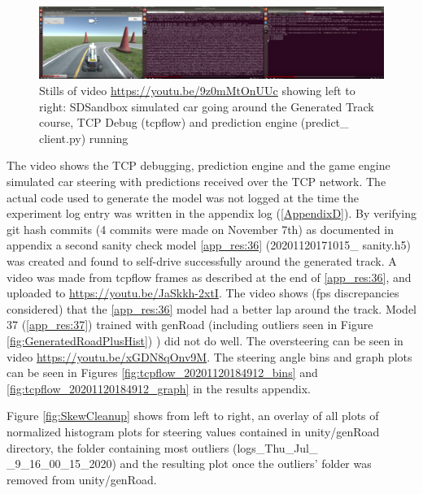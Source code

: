 \begin{figure}[h!]
\centering
\includegraphics[width=\textwidth]{Figures/SimTCPPred.png}
\caption{Stills of video \href{https://youtu.be/9z0mMtOnUUc}{https://youtu.be/9z0mMtOnUUc} showing left to right: SDSandbox simulated car going around the Generated Track course, TCP Debug (tcpflow) and prediction engine (predict\_ client.py) running}
\label{fig:SimTCPPred}
\end{figure}

The video shows the TCP debugging, prediction engine and the game engine simulated car steering with predictions received over the TCP network. The actual code used to generate the model was not logged at the time the experiment log entry was written in the appendix log (\ref{AppendixD}). By verifying git hash commits (4 commits were made on November 7th) as documented in appendix  a second sanity check model \ref{app_res:36} (20201120171015\_ sanity.h5) was created and found to self-drive successfully around the generated track. A video was made from tcpflow frames as described at the end of \ref{app_res:36}, and uploaded to \href{https://youtu.be/JaSkkh-2xtI}{https://youtu.be/JaSkkh-2xtI}.
The video shows (fps discrepancies considered) that the \ref{app_res:36} model had a better lap around the track.
Model 37 (\ref{app_res:37}) trained with genRoad (including outliers seen in Figure \ref{fig:GeneratedRoadPlusHist}) ) did not do well. The oversteering can be seen in video \href{https://youtu.be/xGDN8qOnv9M}{https://youtu.be/xGDN8qOnv9M}. The steering angle bins and graph plots can be seen in  Figures \ref{fig:tcpflow_20201120184912_bins}  and \ref{fig:tcpflow_20201120184912_graph} in the results appendix.


Figure \ref{fig:SkewCleanup} shows from left to right, an overlay of all plots of normalized histogram plots for steering values contained in unity/genRoad directory, the folder containing most outliers (logs\_Thu\_Jul\_ \_9\_16\_00\_15\_2020) and the resulting plot once the outliers' folder was removed from unity/genRoad. 

